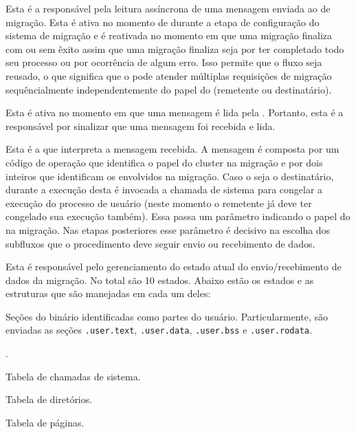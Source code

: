 \begin{description}[leftmargin=*,labelwidth=!,labelindent=0pt]
    \item[1.] Esta é a \task responsável pela leitura assíncrona de uma mensagem enviada ao \daemon de migração. Esta \task é ativa no momento de \boot durante a etapa de configuração do sistema de migração e é reativada no momento em que uma migração finaliza com ou sem êxito \ie assim que uma migração finaliza seja por ter completado todo seu processo ou por ocorrência de algum erro. Isso permite que o fluxo seja reusado, o que significa que o \cluster pode atender múltiplas requisições de migração sequêncialmente independentemente do papel do \cluster (remetente ou destinatário).
    \item[2.] Esta \task é ativa no momento em que uma mensagem é lida pela . Portanto, esta é a \task responsável por sinalizar que uma mensagem foi recebida e lida.
    \item[3.] Esta é a \task que interpreta a mensagem recebida. A mensagem é composta por um código de operação que identifica o papel do cluster na migração e por dois inteiros que identificam os \clusters envolvidos na migração. Caso o \cluster seja o destinatário, durante a execução desta \task é invocada a chamada de sistema \freeze para congelar a execução do processo de usuário (neste momento o \cluster remetente já deve ter congelado sua execução também). Essa \task passa um parâmetro indicando o papel do \cluster na migração. Nas etapas posteriores esse parâmetro é decisivo na escolha dos subfluxos que o procedimento deve seguir \eg envio ou recebimento de dados.
    \item[4.] Esta \task é responsável pelo gerenciamento do estado atual do envio/recebimento de dados da migração. No total são 10 estados. Abaixo estão os estados e as estruturas que são manejadas em cada um deles:
    \begin{description}[leftmargin=!,labelwidth=\widthof{MSTATE\_FRAMES\_BITMAP \qquad}]
        \item [MSTATE\_SECTIONS] Seções do binário identificadas como partes do usuário. Particularmente, são enviadas as seções \texttt{.user.text}, \texttt{.user.data}, \texttt{.user.bss} e \texttt{.user.rodata}.
        \item [MSTATE\_UAREA] \uarea.
        \item [MSTATE\_SYSBOARD] Tabela de chamadas de sistema.
        \item [MSTATE\_PAGEDIR] Tabela de diretórios.
        \item [MSTATE\_PAGETAB] Tabela de páginas.

\end{description}
\end{description}
